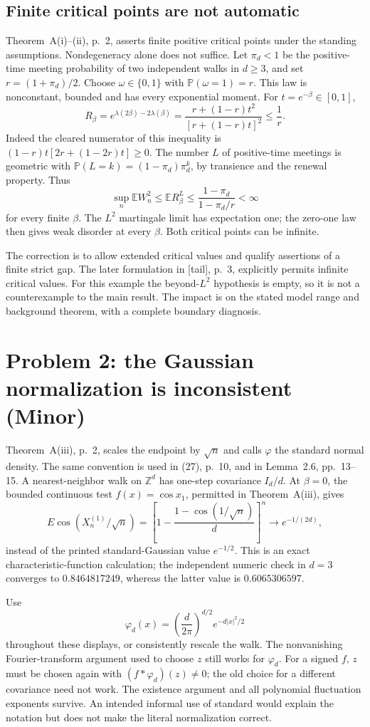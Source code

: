 \documentclass[10pt]{article}
\begin{document}
\subsection*{Finite critical points are not automatic}
Theorem A(i)–(ii), p. 2, asserts finite positive critical points under the standing assumptions. Nondegeneracy alone does not suffice. Let \(\pi_d<1\) be the positive-time meeting probability of two independent walks in \(d\geq3\), and set \(r=(1+\pi_d)/2\). Choose \(\omega\in\{0,1\}\) with \(\mathbb P(\omega=1)=r\). This law is nonconstant, bounded and has every exponential moment. For \(t=e^{-\beta}\in[0,1]\), \[R_\beta=e^{\lambda(2\beta)-2\lambda(\beta)}
 =\frac{r+(1-r)t^2}{[r+(1-r)t]^2}\leq\frac1r.\] Indeed the cleared numerator of this inequality is \((1-r)t[2r+(1-2r)t]\geq0\). The number \(L\) of positive-time meetings is geometric with \(\mathbb P(L=k)=(1-\pi_d)\pi_d^k\), by transience and the renewal property. Thus \[\sup_n\mathbb E W_n^2
 \leq \mathbb E R_\beta^L
 \leq \frac{1-\pi_d}{1-\pi_d/r}<\infty\] for every finite \(\beta\). The \(L^2\) martingale limit has expectation one; the zero-one law then gives weak disorder at every \(\beta\). Both critical points can be infinite.\par
The correction is to allow extended critical values and qualify assertions of a finite strict gap. The later formulation in [tail], p. 3, explicitly permits infinite critical values. For this example the beyond-\(L^2\) hypothesis is empty, so it is not a counterexample to the main result. The impact is on the stated model range and background theorem, with a complete boundary diagnosis.\par
\section*{Problem 2: the Gaussian normalization is inconsistent (Minor)}
Theorem A(iii), p. 2, scales the endpoint by \(\sqrt n\) and calls \(\varphi\) the standard normal density. The same convention is used in (27), p. 10, and in Lemma 2.6, pp. 13–15. A nearest-neighbor walk on \(\mathbb Z^d\) has one-step covariance \(I_d/d\). At \(\beta=0\), the bounded continuous test \(f(x)=\cos x_1\), permitted in Theorem A(iii), gives \[E\cos(X_n^{(1)}/\sqrt n)
 =\left[1-\frac{1-\cos(1/\sqrt n)}d\right]^n
 \longrightarrow e^{-1/(2d)},\] instead of the printed standard-Gaussian value \(e^{-1/2}\). This is an exact characteristic-function calculation; the independent numeric check in \(d=3\) converges to \(0.8464817249\), whereas the latter value is \(0.6065306597\).\par
Use \[\varphi_d(x)=\left(\frac d{2\pi}\right)^{d/2}e^{-d|x|^2/2}\] throughout these displays, or consistently rescale the walk. The nonvanishing Fourier-transform argument used to choose \(z\) still works for \(\varphi_d\). For a signed \(f\), \(z\) must be chosen again with \((f*\varphi_d)(z)\ne0\); the old choice for a different covariance need not work. The existence argument and all polynomial fluctuation exponents survive. An intended informal use of standard would explain the notation but does not make the literal normalization correct.\par
\end{document}
